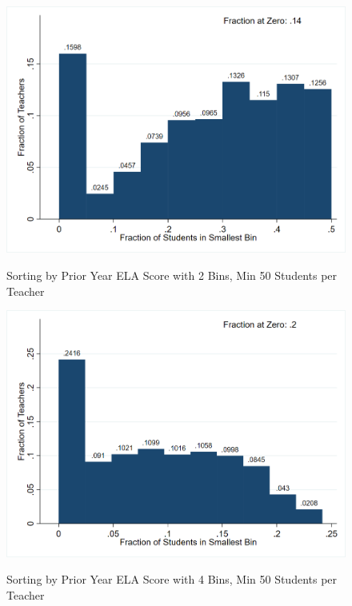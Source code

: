 \documentclass[letterpaper,12pt]{article}
\begin{document}
\begin{figure}[ht]
    \centering
    \caption{Sorting by Prior Year ELA Score with 2 Bins, Min 50 Students per Teacher}
    \includegraphics[width=\textwidth]{figures/ELA_Sorting_2_50.png}
    \label{fig: ELA sort 2 50}
\end{figure}

\begin{figure}[ht]
    \centering
    \caption{Sorting by Prior Year ELA Score with 4 Bins, Min 50 Students per Teacher}
    \includegraphics[width=\textwidth]{figures/ELA_Sorting_4_50.png}
    \label{fig: ELA sort 4 50}
\end{figure}
\end{document}
